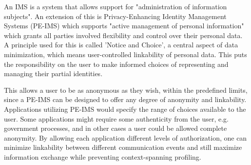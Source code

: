 An IMS is a system that allows support for "administration of information subjects". An extension of this is Privacy-Enhancing Identity Management Systems (PE-IMS) which supports "active management of personal information" which grants all parties involved flexibility and control over their personal data. A principle used for this is called 'Notice and Choice', a central aspect of data minimization, which means user-controlled linkability of personal data. This puts the responsibility on the user to make informed choices of representing and managing their partial identities.

This allows a user to be as anonymous as they wish, within the predefined limits, since a PE-IMS can be designed to offer any degree of anonymity and linkability. Applications utilizing PE-IMS would specify the range of choices available to the user. Some applications might require some authenticity from the user, e.g. government processes, and in other cases a user could be allowed complete anonymity. By allowing each application different levels of authorization, one can minimize linkability between different communication events and still maximize information exchange while preventing context-spanning profiling. %




